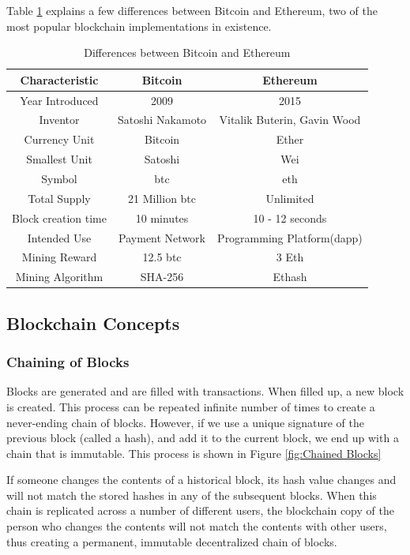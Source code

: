 \documentclass[11pt,openright]{report}
\begin{document}
Table \ref{differences_bitcoin_ethereum} explains a few differences between Bitcoin and Ethereum, two of the most popular blockchain implementations in existence.
 
\begin{table}[!htbp]
	\renewcommand{\arraystretch}{1.3}
	\caption{Differences between Bitcoin and Ethereum}
	\label{differences_bitcoin_ethereum}
	\centering
	\begin{tabular}{|c||c|c|}
		\hline
		\bfseries Characteristic & \bfseries Bitcoin & \bfseries Ethereum\\
		\hline\hline
	    Year Introduced & 2009 & 2015\\ \hline
	    Inventor & Satoshi Nakamoto & Vitalik Buterin, Gavin Wood\\ \hline
	    Currency Unit & Bitcoin & Ether\\ \hline
	    Smallest Unit & Satoshi & Wei\\ \hline
	    Symbol & btc & eth \\ \hline
	    Total Supply & 21 Million btc & Unlimited\\ \hline
	    Block creation time & 10 minutes & 10 - 12 seconds\\ \hline
	    Intended Use & Payment Network & Programming Platform(dapp)\\ \hline
	    Mining Reward & 12.5 btc & 3 Eth \\ \hline
        Mining Algorithm & SHA-256 & Ethash \\ \hline
	\end{tabular}
\end{table}
\newpage

\subsection{Blockchain Concepts}
\subsubsection{Chaining of Blocks}
Blocks are generated and are filled with transactions. When filled up, a new block is created. This process can be repeated infinite number of times to create a never-ending chain of blocks. However, if we use a unique signature of the previous block (called a hash), and add it to the current block, we end up with a chain that is immutable. This process is shown in Figure \ref{fig:Chained Blocks}

If someone changes the contents of a historical block, its hash value changes and will not match the stored hashes in any of the subsequent blocks. When this chain is replicated across a number of different users, the blockchain copy of the person who changes the contents will not match the contents with other users, thus creating a permanent, immutable decentralized chain of blocks.
\end{document}
